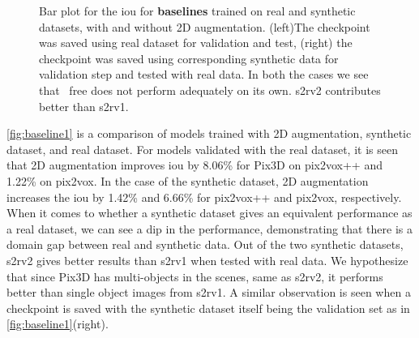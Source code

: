 \begin{figure}[ht]
    \centering
    \resizebox{0.49\linewidth}{0.5\linewidth}{}
    \resizebox{0.49\linewidth}{0.5\linewidth}{}
    \caption{Bar plot for the \gls{iou}  for \textbf{baselines} trained on real and synthetic datasets, with and without 2D augmentation.
        (left)The checkpoint was saved using real dataset for validation and test, (right) the checkpoint was saved using corresponding synthetic data for validation step and tested with real data.
        In both the cases we see that ~\gls{free} does not perform adequately on its own. \gls{s2rv2} contributes better than \gls{s2rv1}.}
    \label{fig:baseline1}
\end{figure}

\autoref{fig:baseline1} is a comparison of models trained with 2D augmentation, synthetic dataset, and real dataset.
For models validated with the real dataset, it is seen that 2D augmentation improves \gls{iou}  by 8.06\% for Pix3D on pix2vox++ and 1.22\% on pix2vox.
In the case of the synthetic dataset, 2D augmentation increases the \gls{iou}  by 1.42\% and 6.66\% for pix2vox++ and pix2vox, respectively.
When it comes to whether a synthetic dataset gives an equivalent performance as a real dataset, we can see a dip in the performance, demonstrating that there is a domain gap between real and synthetic data.
Out of the two synthetic datasets, \gls{s2rv2} gives better results than \gls{s2rv1} when tested with real data.
We hypothesize that since Pix3D has multi-objects in the scenes, same as \gls{s2rv2}, it performs better than single object images from \gls{s2rv1}.
A similar observation is seen when a checkpoint is saved with the synthetic dataset itself being the validation set as in \autoref{fig:baseline1}(right).


